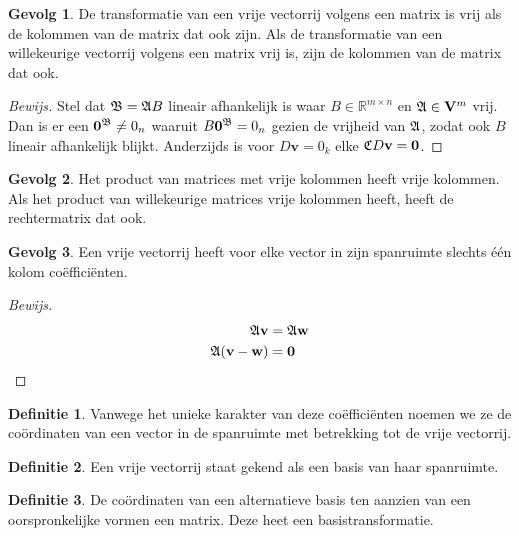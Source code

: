 \documentclass{amsart}
\theoremstyle{definition}
\newtheorem{dfn}{Definitie}[section]
\newtheorem{csq}{Gevolg}[section]
\newenvironment{bewijs}{\begin{proof}[Bewijs]}{\end{proof}}
\newcommand{\realnums}{\mathbb{R}}
\newcommand{\realn}[1][n]{\realnums^{#1}}
\newcommand{\realmx}[2][n]{\realn[#2 \times #1]}
\newcommand{\realmxn}{\realmx{m}}
\newcommand{\vecspace}[1][v]{\mathrm{\mathbf{\MakeUppercase#1}}}
\newcommand{\vecspacen}[1][n]{\vecspace^#1}
\newcommand{\vvec}[1][v]{\mathbf{#1}}
\newcommand{\zerovec}{\vvec[0]}
\newcommand{\vecrow}[1][a]{\mathfrak{\MakeUppercase{#1}}}
\newcommand{\cvec}[2]{{#1}^{#2}}
\newcommand{\cvecv}[2][v]{\cvec{\vvec[#1]}{#2}}
\newcommand{\cvecc}[2][a]{\cvecv[#2]{\vecrow[#1]}}
\begin{document}
\begin{csq}
    De transformatie van een vrije vectorrij volgens een matrix is vrij als de kolommen van de matrix dat ook zijn. Als de transformatie van een willekeurige vectorrij volgens een matrix vrij is, zijn de kolommen van de matrix dat ook.
    \begin{bewijs}
        Stel dat $\vecrow[b] = \vecrow B$ lineair afhankelijk is waar $B \in \realmxn$ en $\vecrow \in \vecspacen[m]$ vrij.
        Dan is er een $\cvecc[b]{0} \neq 0_n$ waaruit $B \cvecc[b]{0} = 0_n$ gezien de vrijheid van $\vecrow$, zodat ook $B$ lineair afhankelijk blijkt.
        Anderzijds is voor $D\vvec = 0_k$ elke $\vecrow[c] D\vvec = \zerovec$.
    \end{bewijs}
\end{csq}

\begin{csq}
    Het product van matrices met vrije kolommen heeft vrije kolommen. Als het product van willekeurige matrices vrije kolommen heeft, heeft de rechtermatrix dat ook.
\end{csq}

\begin{csq}
    Een vrije vectorrij heeft voor elke vector in zijn spanruimte slechts één kolom coëfficiënten.
    \begin{bewijs}
        \begin{align*}
            \vecrow \vvec              & = \vecrow \vvec[w] \\
            \vecrow (\vvec - \vvec[w]) & = \zerovec
        \end{align*}
    \end{bewijs}
\end{csq}

\begin{dfn}
    Vanwege het unieke karakter van deze coëfficiënten noemen we ze de coördinaten van een vector in de spanruimte met betrekking tot de vrije vectorrij.
\end{dfn}

\begin{dfn}
    Een vrije vectorrij staat gekend als een basis van haar spanruimte.
\end{dfn}

\begin{dfn}
    De coördinaten van een alternatieve basis ten aanzien van een oorspronkelijke vormen een matrix.
    Deze heet een basistransformatie.
\end{dfn}
\end{document}
